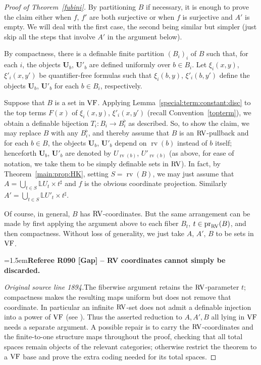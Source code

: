 \documentclass[12pt]{amsart}
\newcommand{\RefereeRemark}[4]{%
  \par\medskip\begingroup\normalfont\small\color{RefereePurple}%
  \emergencystretch=1.5em\noindent\textbf{Referee R#1 [#2] -- #3.}\par\nobreak\noindent #4\par
  \endgroup\medskip
}
\theoremstyle{plain}
\theoremstyle{definition}
\theoremstyle{remark}
\numberwithin{equation}{section}
\theoremstyle{plain}
\newcommand{\VF}{\textup{VF}}
\newcommand{\RV}{\textup{RV}}
\DeclareMathOperator{\pr}{pr}
\newcommand{\0}{\emptyset}
\newcommand{\bb}[1]{\mathbb{#1}}
\newcommand{\fun}{\longrightarrow}
\DeclareMathOperator{\rv}{rv}
\begin{document}
\begin{proof}[Proof of Theorem~\ref{fubini}]
By partitioning $B$ if necessary, it is enough to prove the claim either when $f$, $f'$ are both surjective or when $f$ is surjective and $A'$ is empty. We will  deal with the first case, the second being similar but simpler (just skip all the steps that involve $A'$ in the argument below).


By  compactness, there is a definable finite partition $(B_i)_i$ of $B$ such that, for each $i$, the objects $\bm U_{b}$,  $\bm U'_{b}$ are defined uniformly over $b \in B_i$. Let $\xi_i(x, y)$, $\xi'_i(x, y')$ be quantifier-free formulas such that $\xi_i(b, y)$, $\xi'_i(b, y')$  define the objects $\bm U_{b}$, $\bm U'_{b}$ for each $b \in B_i$, respectively.

Suppose that $B$ is a set in $\VF$. Applying Lemma~\ref{special:term:constant:disc} to the top terms $F(x)$ of $\xi_i(x, y)$, $\xi'_i(x, y')$  (recall Convention~\ref{topterm}), we obtain a definable bijection $T_i : B_i \fun B_i^\flat$ as described. So, to show the claim, we may replace $B$ with any $B_i^\flat$, and thereby assume that $B$ is an $\RV$-pullback and for each $b \in B$, the objects $\bm U_{b}$, $\bm U'_{b}$ depend on $\rv(b)$ instead of $b$ itself; henceforth $\bm U_{b}$, $\bm U'_{b}$ are denoted by $U_{\rv(b)}$, $U'_{\rv(b)}$ (as above, for ease of notation, we take them to be simply definable sets in $\RV$). In fact, by Theorem~\ref{main:prop:HK}, setting $S = \rv(B)$, we may just assume that $A = \bigcup_{t \in S} \bb L U_{t} \times t^\sharp$ and $f$ is the obvious coordinate projection. Similarly  $A' = \bigcup_{t \in S} \bb L U'_{t} \times t^\sharp$.


Of course, in general, $B$ has $\RV$-coordinates. But the same arrangement can be made by first applying the argument above to each fiber $B_t$, $t \in  \pr_{\RV}(B)$, and then compactness.
Without loss of generality, we just take $A$, $A'$, $B$ to be sets in $\VF$.

\RefereeRemark{090}{Gap}{RV coordinates cannot simply be discarded}{%
\textit{Original source line 1894.}\quad The fiberwise argument retains the $\RV$-parameter $t$; compactness makes the resulting maps uniform but does not remove that coordinate. In particular an infinite $\RV$-set does not admit a definable injection into a power of $\VF$ (see \cite[Lemma~3.41]{hrushovski:kazhdan:integration:vf}). Thus the asserted reduction to $A,A',B$ all lying in $\VF$ needs a separate argument. A possible repair is to carry the $\RV$-coordinates and the finite-to-one structure maps throughout the proof, checking that all total spaces remain objects of the relevant categories; otherwise restrict the theorem to a $\VF$ base and prove the extra coding needed for its total spaces.
}


\end{proof}
\end{document}
